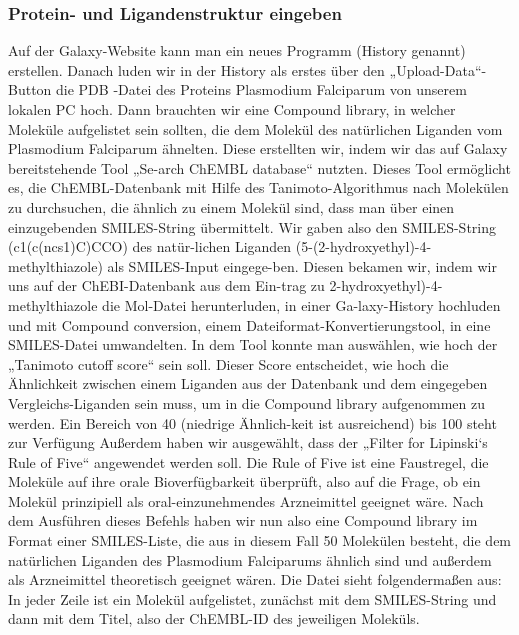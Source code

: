 \documentclass[10pt]{article}
\begin{document}
{    \subsubsection{Protein- und Ligandenstruktur eingeben}\label{subsec:protein--und-ligandenstruktur-eingeben}

    Auf der Galaxy-Website kann man ein neues Programm (History genannt) erstellen. Danach luden wir in der History als erstes über den „Upload-Data“-Button die PDB -Datei des Proteins Plasmodium Falciparum von unserem lokalen PC hoch.
    Dann brauchten wir eine Compound library, in welcher Moleküle aufgelistet sein sollten, die dem Molekül des natürlichen Liganden vom Plasmodium Falciparum ähnelten. Diese erstellten wir, indem wir das auf Galaxy bereitstehende Tool „Se-arch ChEMBL database“ nutzten. Dieses Tool ermöglicht es, die ChEMBL-Datenbank mit Hilfe des Tanimoto-Algorithmus nach Molekülen zu durchsuchen, die ähnlich zu einem Molekül sind, dass man über einen einzugebenden SMILES-String übermittelt. Wir gaben also den SMILES-String (c1(c(ncs1)C)CCO) des natür-lichen Liganden (5-(2-hydroxyethyl)-4-methylthiazole) als SMILES-Input eingege-ben. Diesen bekamen wir, indem wir uns auf der ChEBI-Datenbank aus dem Ein-trag zu 2-hydroxyethyl)-4-methylthiazole die Mol-Datei herunterluden, in einer Ga-laxy-History hochluden und mit Compound conversion, einem Dateiformat-Konvertierungstool, in eine SMILES-Datei umwandelten.
    In dem Tool konnte man auswählen, wie hoch der „Tanimoto cutoff score“ sein soll. Dieser Score entscheidet, wie hoch die Ähnlichkeit zwischen einem Liganden aus der Datenbank und dem eingegeben Vergleichs-Liganden sein muss, um in die Compound library aufgenommen zu werden. Ein Bereich von 40 (niedrige Ähnlich-keit ist ausreichend) bis 100 steht zur Verfügung Außerdem haben wir ausgewählt, dass der „Filter for Lipinski‘s Rule of Five“ angewendet werden soll. Die Rule of Five ist eine Faustregel, die Moleküle auf ihre orale Bioverfügbarkeit überprüft, also auf die Frage, ob ein Molekül prinzipiell als oral-einzunehmendes Arzneimittel geeignet wäre.
    Nach dem Ausführen dieses Befehls haben wir nun also eine Compound library im Format einer SMILES-Liste, die aus in diesem Fall 50 Molekülen besteht, die dem natürlichen Liganden des Plasmodium Falciparums ähnlich sind und außerdem als Arzneimittel theoretisch geeignet wären. Die Datei sieht folgendermaßen aus: In jeder Zeile ist ein Molekül aufgelistet, zunächst mit dem SMILES-String und dann mit dem Titel, also der ChEMBL-ID des jeweiligen Moleküls.
}
\end{document}
